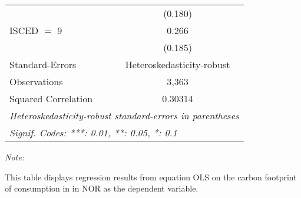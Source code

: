\begin{table}[htbp!]
\begin{adjustbox}{width = 1\textwidth, max height = 0.95\textheight, center}
\begin{threeparttable}[b]
\begin{tabular}{lc}
                                & (0.180)\\   
            ISCED $=$ 9         & 0.266\\   
                                & (0.185)\\   
            \midrule 
            Standard-Errors     & Heteroskedasticity-robust \\   
            Observations        & 3,363\\  
            Squared Correlation & 0.30314\\  
            \midrule \midrule
            \multicolumn{2}{l}{\emph{Heteroskedasticity-robust standard-errors in parentheses}}\\
            \multicolumn{2}{l}{\emph{Signif. Codes: ***: 0.01, **: 0.05, *: 0.1}}\\
         \end{tabular}
         
         \begin{tablenotes}\item \medskip \textit{Note:}
            \item This table displays regression results from equation OLS on the carbon footprint of consumption in  in NOR as the dependent variable.  
         \end{tablenotes}
      \end{threeparttable}
   \end{adjustbox}
\end{table}


